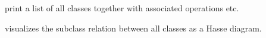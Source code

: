\begin{isabellebody}
\begin{isamarkuptext}
  \begin{description}

    \item[\hyperlink{command.print-classes}{\mbox{}}] print a list of all classes
      together with associated operations etc.

    \item[\hyperlink{command.class-deps}{\mbox{}}] visualizes the subclass relation
      between all classes as a Hasse diagram.

  \end{description}%
\end{isamarkuptext}%
\isamarkuptrue%
%
\isadelimtheory
%
\endisadelimtheory
%
\isatagtheory
{}\isamarkupfalse%
%
\endisatagtheory
{\isafoldtheory}%
%
\isadelimtheory
%
\endisadelimtheory
\isanewline
\end{isabellebody}%
